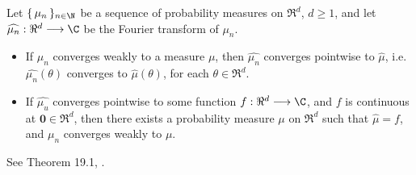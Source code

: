 \documentclass{article}
\begin{document}
\begin{theorem}\label{LeviContinuityTheorem} \mbox{} \vskip 0.1cm \noindent
Let $\{\,\mu_{n}\,\}_{n\in\N}$ be a sequence of probability measures on $\Re^{d}$, $d \geq 1$, and let $\widehat{\mu_{n}}:\Re^{d}\longrightarrow\C$ be the Fourier transform of $\mu_{n}$.
\begin{itemize}
\item  If $\mu_{n}$ converges weakly to a measure $\mu$, then $\widehat{\mu_{n}}$ converges pointwise to $\widehat{\mu}$,
          i.e. $\widehat{\mu_{n}}(\theta)$ converges to $\widehat{\mu}(\theta)$, for each $\theta\in\Re^{d}$.
\item  If $\widehat{\mu_{u}}$ converges pointwise to some function $f:\Re^{d}\longrightarrow\C$,
          and $f$ is continuous at $\mathbf{0}\in\Re^{d}$,
          then there exists a probability measure $\mu$ on $\Re^{d}$ such that $\widehat{\mu} = f$,
          and $\mu_{n}$ converges weakly to $\mu$.
\end{itemize}
\end{theorem}
See Theorem 19.1, \cite{JacodProtter}.


%
%
%



\end{document}
